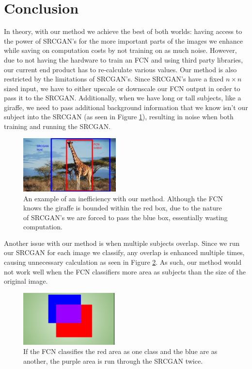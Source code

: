 \section{Conclusion}

In theory, with our method we achieve the best of both worlds: having access to the power of SRCGAN’s for the more important parts of the images we enhance while saving on computation costs by not training on as much noise. However, due to not having the hardware to train an FCN and using third party libraries, our current end product has to re-calculate various values.
Our method is also restricted by the limitations of SRCGAN’s. Since SRCGAN’s
have a fixed $n \times n$ sized input, we have to either upscale or downscale our FCN
output in order to pass it to the SRCGAN. Additionally, when we have long or
tall subjects, like a giraffe, we need to pass additional background information
that we know isn’t our subject into the SRCGAN (as seen in Figure \ref{fig:giraffe}), resulting in
noise when both training and running the SRCGAN.

\begin{figure}
    \centering
    \includegraphics[width=0.45\textwidth]{images/giraffe.png}
    \caption{An example of an inefficiency with our method. Although the FCN knows the giraffe is bounded within the red box, due to the nature of SRCGAN's we are forced to pass the blue box, essentially wasting computation.}
    \label{fig:giraffe}
\end{figure}


Another issue with our method is when multiple subjects overlap. Since we run our SRCGAN for each image we classify, any overlap is enhanced multiple times, causing unnecessary calculation as seen in Figure \ref{fig:crossover}. As such, our method would not work well when the FCN classifiers more area as subjects than the size of the original image.

\begin{figure}
    \centering
    \includegraphics[width=0.45\textwidth]{images/crossover.png}
    \caption{If the FCN classifies the red area as one class and the blue are as another, the purple area is run through the SRCGAN twice.}
    \label{fig:crossover}
\end{figure}


